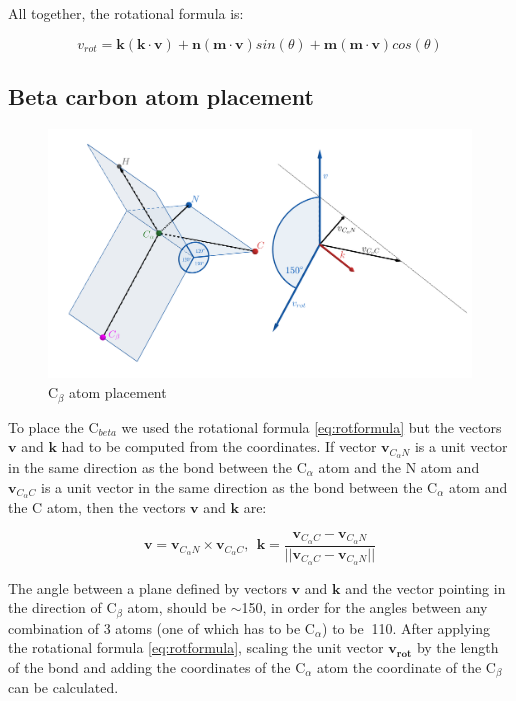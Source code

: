 All together, the rotational formula is:

\begin{equation}
    v_{rot} = \bm{k}(\bm{k} \cdot \bm{v}) + \bm{n} (\bm{m} \cdot \bm{v}) sin(\theta) + \bm{m} (\bm{m} \cdot \bm{v}) cos(\theta)
    \label{eq:rotformula}
\end{equation}

\subsection{Beta carbon atom placement}

\begin{figure}
    \centering
    \includegraphics[width=\linewidth]{imgs_tomas/cbeta.png}
    \caption{C$_\beta$ atom placement}
    \label{fig:cbeta}
\end{figure}

To place the C$_{beta}$ we used the rotational formula \ref{eq:rotformula} but the vectors $\bm{v}$ and $\bm{k}$ had to be computed from the coordinates. If vector $\bm{v}_{C_\alpha N}$ is a unit vector in the same direction as the bond between the C$_\alpha$ atom and the N atom and $\bm{v}_{C_\alpha C}$ is a unit vector in the same direction as the bond between the C$_\alpha$ atom and the C atom, then the vectors $\bm{v}$ and $\bm{k}$ are:

$$\bm{v} = \bm{v}_{C_\alpha N} \times  \bm{v}_{C_\alpha C}, ~~ \bm{k} = \frac{\bm{v}_{C_\alpha C} -  \bm{v}_{C_\alpha N}}{||\bm{v}_{C_\alpha C} -  \bm{v}_{C_\alpha N}||}$$

The angle between a plane defined by vectors $\bm{v}$ and $\bm{k}$ and the vector pointing in the direction of C$_\beta$ atom, should be $\sim$150\degree, in order for the angles between any combination of 3 atoms (one of which has to be C$_\alpha$) to be $~$110\degree.
After applying the rotational formula \ref{eq:rotformula}, scaling the unit vector $\bm{v_{rot}}$ by the length of the bond and adding the coordinates of the C$_\alpha$ atom the coordinate of the C$_\beta$ can be calculated.

